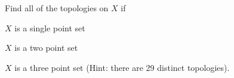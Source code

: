 \begin{comment}
The longest sequence for which $\tau$ is the seventh topology is
\[\{\emptyset, X\} \subset \{\emptyset, \{b\}, \{a,b\}, \{b,c\}, X\} \subset  \{\emptyset, \{a\}, \{b\}, \{a,b\}, \{b,c\}, X\} \subset \tau_D.\]

The longest sequence for which $\tau$ is the eighth topology is
\[\{\emptyset, X\} \subset \{\emptyset, \{b\}, \{c\}, \{b,c\}, \{a,c\}, X\} \subset \tau_D.\]

The longest sequence for which $\tau$ is the ninth topology is
\[\{\emptyset, X\}  \{\emptyset, \{a\}, \{b\}, \{a,b\}, \{b,c\}, X\} \subset \tau_D.\]

Finally, the longest sequence for which $\tau$ is the discrete topology is
\[\{\emptyset, X\}  \subset \tau_D.\]

\ea

\end{comment}

\item Find all of the topologies on $X$ if 

\ba

\item $X$ is a single point set

\item $X$ is a two point set

\item $X$ is a three point set (Hint: there are 29 distinct topologies).

\ea

